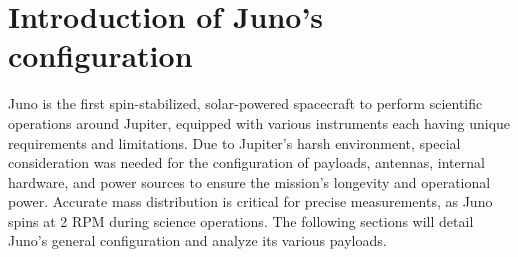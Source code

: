\section{Introduction of Juno's configuration}
\label{sec:config_introduction}

Juno is the first spin-stabilized, solar-powered spacecraft to perform scientific operations around Jupiter, equipped with various instruments each having unique requirements and limitations. Due to Jupiter's harsh environment, special consideration was needed for the configuration of payloads, antennas, internal hardware, and power sources to ensure the mission's longevity and operational power. Accurate mass distribution is critical for precise measurements, as Juno spins at 2 RPM during science operations\cite{Juno_launch}. The following sections will detail Juno's general configuration and analyze its various payloads.